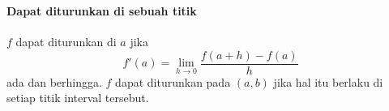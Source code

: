 \documentclass{../../kalkulus-ppt}
\begin{document}
\begin{frame}
\frametitle{\insertsection}
\framesubtitle{Dapat diturunkan di sebuah titik}

\begin{definisi}
$f$ dapat diturunkan di $a$ jika
\[f'(a)=\lim_{h\to0}\frac{f(a+h)-f(a)}h\]
ada dan berhingga. $f$ dapat diturunkan pada $(a,b)$ jika hal itu berlaku di setiap titik interval tersebut.
\end{definisi}
\end{frame}
\end{document}
